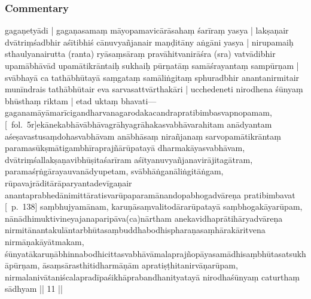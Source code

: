 \documentclass[12pt]{article}
\newcommand{\emdash} {\hspace{0em}—\hspace{0em}}
\begin{document}
\subsubsection{Commentary}
gagaṇetyādi | gagaṇasamaṃ māyopamavicārāsahaṃ śarīraṃ yasya | lakṣaṇair dvātriṃśadbhir aśītibhiś cānuvyañjanair maṇḍitāny aṅgāni yasya | nirupamaiḥ sthaulyanairutta (ranta) ryāsaṃsāraṃ pravāhitvanirāśra (sra) vatvādibhir upamābhāvād upamātikrāntaiḥ sukhaiḥ pūrṇatāṃ samāśrayantaṃ sampūrṇam | svābhayā ca tathābhūtayā saṃgataṃ samāliṅgitaṃ sphuradbhir anantanirmitair munīndrais tathābhūtair eva sarvasattvārthakāri | ucchedeneti nirodhena śūnyaṃ bhūsthaṃ riktam | etad uktaṃ bhavati\emdash gaganamāyāmarīcigandharvanagarodakacandrapratibimbasvapnopamam, [\MS\ fol.\ 5r]ekānekabhāvābhāvagrāhyagrāhakasvabhāvarahitam anādyantam aśeṣavastusaṃdohasvabhāvam anābhāsaṃ nirañjanaṃ sarvopamātikrāntaṃ paramasūkṣmātigambhīraprajñārūpatayā dharmakāyasvabhāvam, dvātriṃśallakṣaṇavibhūṣitaśarīram aśītyanuvyañjanavirājitagātram, paramaśṛṅgārayauvanādyupetam, svābhāṅganāliṅgitāṅgam, rūpavajrāditārāparyantadevīgaṇair anantaprabhedānimittāratisvarūpaparamānandopabhogadvāreṇa pratibimbavat [\EDD\ p.\ 138] saṃbhujyamānam, karuṇāsaṃvalitodārarūpatayā saṃbhogakāyarūpam, nānādhimuktivineyajanaparipāva(ca)nārtham anekavidhaprātihāryadvāreṇa nirmitānantakulāntarbhūtasaṃbuddhabodhispharaṇasaṃhārakāritvena nirmāṇakāyātmakam, śūnyatākaruṇābhinnabodhicittasvabhāvāmalaprajñopāyasamādhisaṃbhūtasatsukhāpūrṇam, āsaṃsārasthitidharmāṇām apratiṣṭhitanirvāṇarūpam, nirmalanivātaniścalapradīpaśikhāprabandhanityatayā nirodhaśūnyaṃ caturthaṃ sādhyam || 11 ||\\
\end{document}

